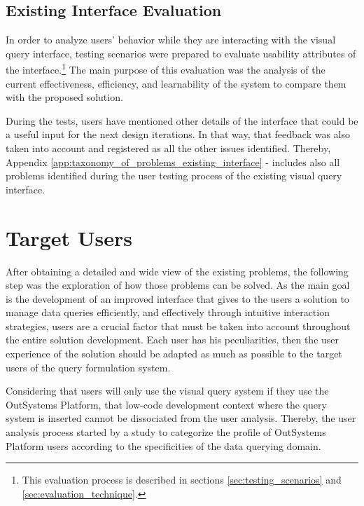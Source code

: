 \subsection{Existing Interface Evaluation}
\label{sec:existing_interface_evaluation}

In order to analyze users' behavior while they are interacting with the visual query interface, testing scenarios were prepared to evaluate usability attributes of the interface.\footnote{This evaluation process is described in sections \ref{sec:testing_scenarios} and \ref{sec:evaluation_technique}.} The main purpose of this evaluation was the analysis of the current effectiveness, efficiency, and learnability of the system to compare them with the proposed solution. 

During the tests, users have mentioned other details of the interface that could be a useful input for the next design iterations. In that way, that feedback was also taken into account and registered as all the other issues identified. Thereby, Appendix \ref{app:taxonomy_of_problems_existing_interface} -  includes also all problems identified during the user testing process of the existing visual query interface.


\section{Target Users}
\label{sec:target_users}

After obtaining a detailed and wide view of the existing problems, the following step was the exploration of how those problems can be solved. As the main goal is the development of an improved interface that gives to the users a solution to manage data queries efficiently, and effectively through intuitive interaction strategies, users are a crucial factor that must be taken into account throughout the entire solution development. Each user has his peculiarities, then the user experience of the solution should be adapted as much as possible to the target users of the query formulation system.

Considering that users will only use the visual query system if they use the OutSystems Platform, that low-code development context where the query system is inserted cannot be dissociated from the user analysis. Thereby, the user analysis process started by a study to categorize the profile of OutSystems Platform users according to the specificities of the data querying domain.

